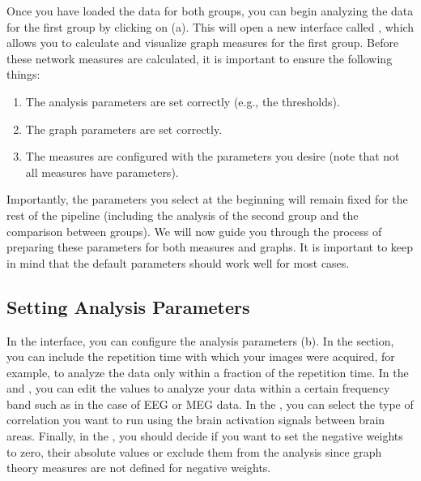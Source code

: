 \documentclass[justified]{tufte-handout}
\begin{document}
Once you have loaded the data for both groups, you can begin analyzing the data for the first group by clicking on  (a). 
This will open a new interface called , which allows you to calculate and visualize graph measures for the first group. 
Before these network measures are calculated, it is important to ensure the following things: 
\begin{enumerate}
	\item The analysis parameters are set correctly (e.g., the thresholds).
	\item The graph parameters are set correctly.
	\item The measures are configured with the parameters you desire (note that not all measures have parameters).
\end{enumerate}

Importantly, the parameters you select at the beginning will remain fixed for the rest of the pipeline (including the analysis of the second group and the comparison between groups). We will now guide you through the process of preparing these parameters for both measures and graphs. It is important to keep in mind that the default parameters should work well for most cases.

\subsection{Setting Analysis Parameters}

In the  interface, you can configure the analysis parameters (b).
In the  section, you can include the repetition time with which your images were acquired, for example, to analyze the data only within a fraction of the repetition time.
In the  and , you can edit the values to analyze your data within a certain frequency band such as in the case of EEG or MEG data.
In the , you can select the type of correlation you want to run using the brain activation signals between brain areas. 
Finally, in the , you should decide if you want to set the negative weights to zero, their absolute values or exclude them from the analysis since graph theory measures are not defined for negative weights.
\end{document}
